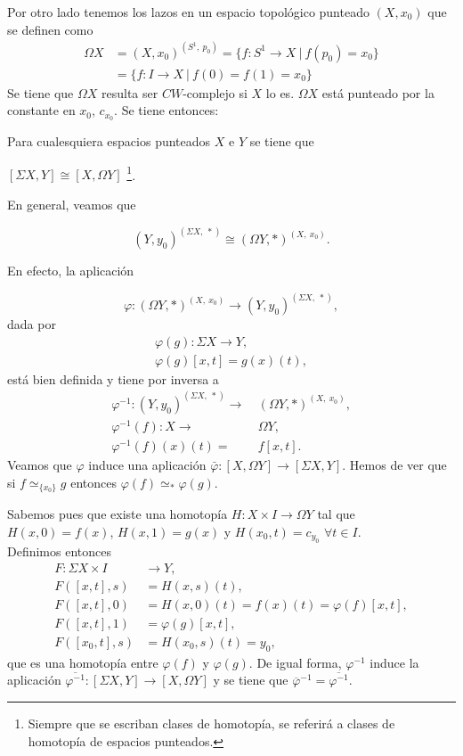Por otro lado tenemos los lazos en un espacio topológico punteado $(X, x_0)$ que se definen como
\begin{align*}
\Omega X &= (X, x_0)^{(S^1, \ p_0)} = \{ f : S^1 \longrightarrow X \ \vert \ f(p_0)  = x_0 \} \\ 
&= \{ f : I \longrightarrow X \ \vert \ f(0) = f(1) = x_0 \}
\end{align*}
Se tiene que $\Omega X$ resulta ser $CW$-complejo si $X$ lo es. $\Omega X$ está punteado por la constante en $x_0$, $c_{x_0}$. Se tiene entonces: 
\newpage
\begin{teor}
Para cualesquiera espacios punteados $X$ e  $Y$ se tiene que 
\begin{center}
$[\Sigma X, Y ] \cong [X, \Omega Y]$ \footnote{Siempre que se escriban clases de homotopía, se referirá a clases de homotopía de espacios punteados.}.
\end{center}
\end{teor}
\begin{demo}
En general, veamos que

\[ (Y, y_0)^{(\Sigma X, \ \ast)} \cong (\Omega Y, \ast)^{(X, \ x_0)}. \]

En efecto, la aplicación

\[ \varphi : (\Omega Y, \ast)^{(X, \ x_0)} \longrightarrow (Y, y_0)^{(\Sigma X, \ \ast)}, \]
dada por 
\begin{align*}
\varphi (g) : \Sigma X \longrightarrow Y, \\
\varphi (g)[x, t] = g(x)(t),
\end{align*} 
está bien definida y tiene por inversa a 
\begin{align*}
\varphi^{-1} :  (Y,  y_0)^{(\Sigma X, \ \ast)} \longrightarrow & \ (\Omega Y, \ast)^{(X, \ x_0)},\\
\varphi^{-1} (f) : X \longrightarrow & \ \Omega Y, \\
\varphi^{-1}(f)(x)(t) = & \ f[x, t].
\end{align*}
Veamos que $\varphi$ induce una aplicación $\bar{\varphi} : [X, \Omega Y] \longrightarrow [\Sigma X, Y] $. Hemos de ver que si $f \simeq_{\{ x_0 \}} g$ entonces $\varphi (f) \simeq_{\ast} \varphi (g)$. \par
Sabemos pues que existe una homotopía $H: X \times I \longrightarrow \Omega Y$ tal que $H(x,0) = f(x) $, $H(x,1) = g(x)$ y 
$H(x_0, t) = c_{y_0}$ $\forall t \in I$.\\
Definimos entonces 
\begin{align*}
F: \Sigma X \times I &\longrightarrow Y, \\
F([x,t],s) &= H(x,s)(t), \\
F([x,t],0) &= H(x,0)(t) = f(x)(t) = \varphi(f)[x,t], \\
F([x,t], 1) &= \varphi(g)[x,t], \\
F([x_0,t],s) &= H(x_0, s)(t) = y_0,
\end{align*}
que es una homotopía entre $\varphi (f)$ y $\varphi (g)$.
De igual forma, $\varphi^{-1}$ induce la aplicación $\overline{\varphi^{-1}} : [\Sigma X, Y] \longrightarrow [X, \Omega Y]$ y se tiene que $\overline{\varphi}^{-1} = \overline{\varphi^{-1}}$.\\
\end{demo}

